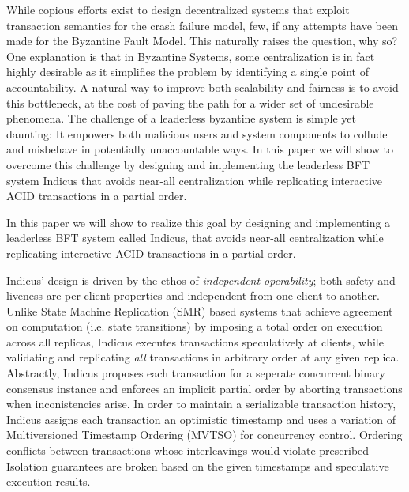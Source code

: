 While copious efforts exist to design decentralized systems that exploit transaction semantics for the crash failure model, few, if any attempts have been made for the Byzantine Fault Model. This naturally raises the question, why so? One explanation is that in Byzantine Systems, some centralization is in fact highly desirable as it simplifies the problem by identifying a single point of accountability. A natural way to improve both scalability and fairness is to avoid this bottleneck, at the cost of paving the path for a wider set of undesirable phenomena. The challenge of a leaderless byzantine system is simple yet daunting: It empowers both malicious users and system components to collude and misbehave in potentially unaccountable ways.
In this paper we will show to overcome this challenge by designing and implementing the leaderless BFT system Indicus that avoids near-all centralization while replicating interactive ACID transactions in a partial order. 
\\
\fi

In this paper we will show to realize this goal by designing and implementing a leaderless BFT system called Indicus, that avoids near-all centralization while replicating interactive ACID transactions in a partial order. 

Indicus' design is driven by the ethos of \textit{independent operability}; both safety  and liveness  are per-client properties and independent from one client to another.
 Unlike State Machine Replication (SMR) based systems that achieve agreement on computation (i.e. state transitions) by imposing a total order on execution across all replicas, Indicus executes transactions speculatively at clients, while validating and replicating \textit{all } transactions in arbitrary order at any given replica. Abstractly, Indicus proposes each transaction for a seperate concurrent binary consensus instance and enforces an implicit partial order by aborting transactions when inconistencies arise. In order to maintain a serializable transaction history, Indicus assigns each transaction an optimistic timestamp and uses a variation of Multiversioned Timestamp Ordering (MVTSO) for concurrency control. Ordering conflicts between transactions whose interleavings would violate prescribed Isolation guarantees are broken based on the given timestamps and speculative execution results. \\

